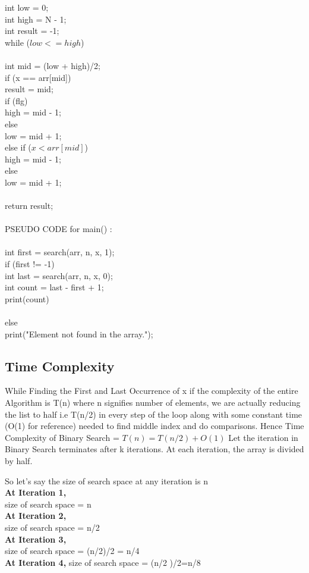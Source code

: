 \documentclass[conference]{IEEEtran}
\begin{document}
int low = 0; \\
int high = N - 1; \\
int result = -1;\\
while ($low <= high$)\\
{\\
int mid = (low + high)/2;\\
if (x == arr[mid])\\
result = mid;\\
if (flg)\\
high = mid - 1;\\
else\\
low = mid + 1;\\
else if ($x < arr[mid]$)\\
high = mid - 1;\\
else\\
low = mid + 1;\\
}\\
return result;\\ \\
PSEUDO CODE for main() : \\ \\
int first = search(arr, n, x, 1);\\
if (first != -1){\\
int last = search(arr, n, x, 0);\\
int count = last - first + 1;\\
print(count) \\
}\\
else\\
print("Element not found in the array.");\\

\subsection{Time Complexity}

While Finding the First and Last Occurrence of x if the complexity of the entire Algorithm is T(n) where n signifies number of elements, we are actually reducing the list to half i.e T(n/2) in every step of the loop along with some constant time (O(1) for reference) needed to find middle index and do comparisons.
Hence Time Complexity of Binary
Search = $T(n) = T(n/2) + O(1)$
Let the iteration in Binary Search terminates
after k iterations.
At each iteration, the array is divided by
half.

So let’s say the size of search space at any
iteration is n\\
\textbf{At Iteration 1,}\\
size of search space = n\\
\textbf{At Iteration 2,}\\
size of search space = n/2\\
\textbf{At Iteration 3,}\\
size of search space = (n/2)/2 = n/4\\
\textbf{At Iteration 4,}
size of search space = (n/2 )/2=n/8 \\
\end{document}
